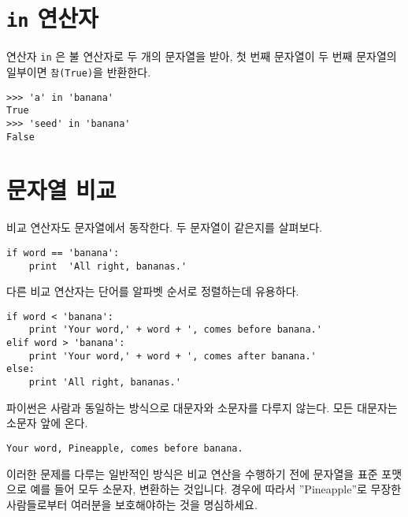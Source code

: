 \section{    {\tt in} 연산자}
\label{inboth}


연산자 {\tt in} 은 불 연산자로 두 개의 문자열을 받아, 첫 번째 문자열이 두 번째 문자열의 일부이면 {\tt 참(True)}을 반환한다.

\beforeverb
\begin{verbatim}
>>> 'a' in 'banana'
True
>>> 'seed' in 'banana'
False
\end{verbatim}
\afterverb
%

\section{    문자열 비교}


비교 연산자도 문자열에서 동작한다. 
두 문자열이 같은지를 살펴보다.

\beforeverb
\begin{verbatim}
if word == 'banana':
    print  'All right, bananas.'
\end{verbatim}
\afterverb
%

다른 비교 연산자는 단어를 알파벳 순서로 정렬하는데 유용하다.

\beforeverb
\begin{verbatim}
if word < 'banana':
    print 'Your word,' + word + ', comes before banana.'
elif word > 'banana':
    print 'Your word,' + word + ', comes after banana.'
else:
    print 'All right, bananas.'
\end{verbatim}
\afterverb
%

파이썬은 사람과 동일하는 방식으로 대문자와 소문자를 다루지 않는다.
모든 대문자는 소문자 앞에 온다.

\beforeverb
\begin{verbatim}
Your word, Pineapple, comes before banana.
\end{verbatim}
\afterverb
%

이러한 문제를 다루는 일반적인 방식은 비교 연산을 수행하기 전에 문자열을 표준 포맷으로 예를 들어 모두 소문자, 변환하는 것입니다.
경우에 따라서 ''Pineapple''로 무장한 사람들로부터 여러분을 보호해야하는 것을 명심하세요.

